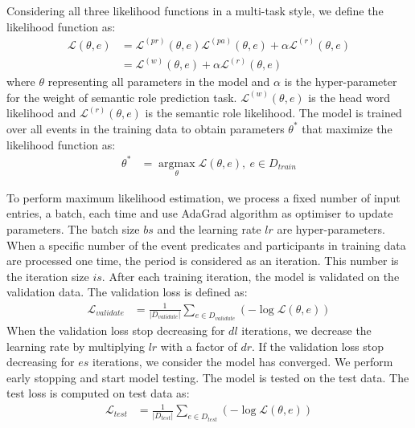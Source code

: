 \documentclass[a4paper]{article}
\begin{document}
Considering all three likelihood functions in a multi-task style, we define the likelihood function as:
\begin{equation} \label{eq:likelihood}
\begin{aligned}
    \mathcal{L}(\theta, e)
    &= \mathcal{L}^{(pr)}(\theta, e) \mathcal{L}^{(pa)}(\theta, e) + \alpha \mathcal{L}^{(r)}(\theta, e)  \\
    &= \mathcal{L}^{(w)}(\theta, e) + \alpha \mathcal{L}^{(r)}(\theta, e)
\end{aligned}
\end{equation}
where $\theta$ representing all parameters in the model and $\alpha$ is the hyper-parameter for the weight of semantic role prediction task. $\mathcal{L}^{(w)}(\theta, e)$ is the head word likelihood and $\mathcal{L}^{(r)}(\theta, e)$ is the semantic role likelihood. 
The model is trained over all events in the training data to obtain parameters $\theta^*$ that maximize the likelihood function as:
\begin{equation} \label{eq:mle}
\begin{aligned}
    \theta^*
        &= \mathop{argmax} \limits_{\theta} \mathcal{L}(\theta, e),\ e \in D_{train}
\end{aligned}
\end{equation}

To perform maximum likelihood estimation, we process a fixed number of input entries, a batch, each time and use AdaGrad algorithm \citep{duchi2011adaptive} as optimiser to update parameters. The batch size $bs$ and the learning rate $lr$ are hyper-parameters. When a specific number of the event predicates and participants in training data are processed one time, the period is considered as an iteration. This number is the iteration size $is$. After each training iteration, the model is validated on the validation data. The validation loss is defined as: 
\begin{equation} \label{eq:validation}
\begin{aligned}
    \mathcal{L}_{validate}
        &= \frac{1}{|D_{validate}|} \sum_{e \in D_{validate}} (-\log \mathcal{L}(\theta, e))
\end{aligned}
\end{equation}
When the validation loss stop decreasing for $dl$ iterations, we decrease the learning rate by multiplying $lr$ with a factor of $dr$. If the validation loss stop decreasing for $es$ iterations, we consider the model has converged. We perform early stopping and start model testing. The model is tested on the test data. The test loss is computed on test data as:
\begin{equation} \label{eq:test-likelihood}
\begin{aligned}
    \mathcal{L}_{test}
        &= \frac{1}{|D_{test}|} \sum_{e \in D_{test}} (-\log \mathcal{L}(\theta, e))
\end{aligned}
\end{equation}
\end{document}
